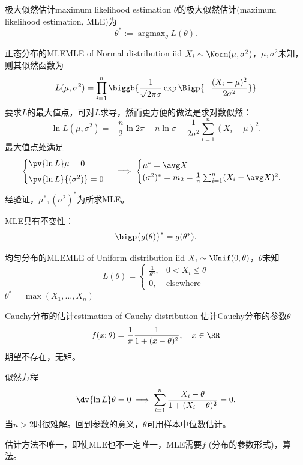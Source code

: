 \begin{definition}{极大似然估计}{maximum likelihood estimation}
	$\theta$的极大似然估计(maximum likelihood estimation, MLE)为
	\begin{equation}
		\theta^\ast:=\mathop{\arg\max}_\theta L(\theta).
	\end{equation}
\end{definition}
\begin{example}{正态分布的MLE}{MLE of Normal distribution}
	iid $X_i\sim\Norm(\mu,\sigma^2)$，$\mu,\sigma^2$未知，则其似然函数为
	\[
		L(\mu,\sigma^2)=\prod_{i=1}^n\biggb{\frac1{\sqrt{2\pi}\sigma}\exp\Bigp{-\frac{(X_i-\mu)^2}{2\sigma^2}}}
	\]
	要求$L$的最大值点，可对$L$求导，然而更方便的做法是求对数似然：
	\[
		\ln L(\mu,\sigma^2)=-\frac n2\ln2\pi-n\ln\sigma-\frac1{2\sigma^2}\sum_{i=1}^n(X_i-\mu)^2.
	\]
	最大值点处满足
	\[
		\begin{cases}
			\pv{\ln L}\mu=0\\[1ex]
			\pv{\ln L}{(\sigma^2)}=0
		\end{cases}\implies
		\begin{cases}
			\mu^\ast=\avg X\\
			(\sigma^2)^\ast=m_2=\frac1n\sum_{i=1}^n(X_i-\avg X)^2.
		\end{cases}
	\]
	经验证，$\mu^\ast,(\sigma^2)^\ast$为所求MLE。
\end{example}
\begin{remark}
	MLE具有不变性：
	\begin{equation}
		\bigp{g(\theta)}^\ast=g(\theta^\ast).
	\end{equation}
\end{remark}
\begin{example}{均匀分布的MLE}{MLE of Uniform distribution}
	iid $X_i\sim\Unif(0,\theta)$，$\theta$未知
	\[
		L(\theta)=\begin{cases}
			\frac1{\theta^n},&0<X_i\leqslant\theta\\
			0,&\text{elsewhere}
		\end{cases}
	\]
	$\theta^\ast=\max(X_1,\ldots,X_n)$
\end{example}
\begin{example}{Cauchy分布的估计}{estimation of Cauchy distribution}
	估计Cauchy分布的参数$\theta$
	\[
		f(x;\theta)=\frac1\pi\frac1{1+(x-\theta)^2},\quad x\in\RR
	\]
	期望不存在，无矩。
	
	似然方程
	\[
		\dv{\ln L}\theta=0\implies\sum_{i=1}^n\frac{X_i-\theta}{1+(X_i-\theta)^2}=0.
	\]
	当$n>2$时很难解。回到参数的意义，$\theta$可用样本中位数估计。
\end{example}
估计方法不唯一，即使MLE也不一定唯一，MLE需要$f$ (分布的参数形式)，算法。

